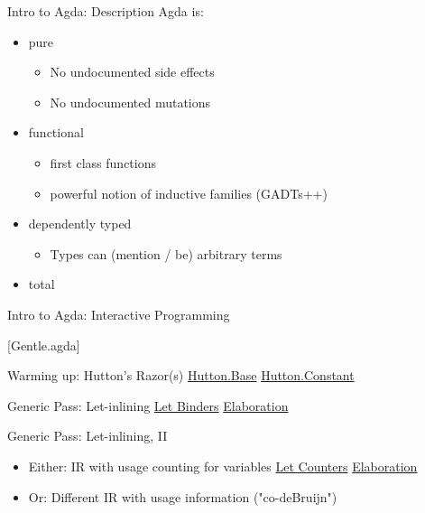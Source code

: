 \documentclass{beamer}
\newcommand{\codehere}[1]{
\begin{center}
{\large[#1.agda]}
\end{center}
}
\begin{document}
\begin{frame}{Intro to Agda: Description}
Agda is:
\begin{itemize}
  \item pure
    \begin{itemize}
      \item No undocumented side effects
      \item No undocumented mutations
    \end{itemize}
  \item functional
    \begin{itemize}
      \item first class functions
      \item powerful notion of inductive families (GADTs++)
    \end{itemize}
  \item dependently typed
    \begin{itemize}
      \item Types can (mention / be) arbitrary terms
    \end{itemize}
  \item<1> total
\end{itemize}

\end{frame}

\begin{frame}{Intro to Agda: Interactive Programming}
\codehere{Gentle}
\end{frame}

\begin{frame}{Warming up: Hutton's Razor(s)}
  \href{run:Hutton/Base.agda}{Hutton.Base}
  \href{run:Hutton/Constant.agda}{Hutton.Constant}
\end{frame}

\begin{frame}{Generic Pass: Let-inlining}
  \href{run:/home/gallais/projects/generic-syntax/src/Generic/Syntax/LetBinder.agda}{Let Binders}
  \newline
  \href{run:/home/gallais/projects/generic-syntax/src/Generic/Semantics/Elaboration/LetBinder.agda}{Elaboration}
\end{frame}

\begin{frame}{Generic Pass: Let-inlining, II}
\begin{itemize}
  \item Either: IR with usage counting for variables
    \newline
    \href{run:/home/gallais/projects/generic-syntax/src/Generic/Syntax/LetCounter.agda}{Let Counters}
    \newline
    \href{run:/home/gallais/projects/generic-syntax/src/Generic/Semantics/Elaboration/LetCounter.agda}{Elaboration}

  \item Or: Different IR with usage information ("co-deBruijn")
\end{itemize}
\end{frame}
\end{document}
